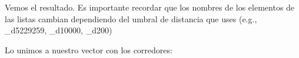 \documentclass[
]{book}
\newenvironment{Shaded}{\begin{snugshade}}{\end{snugshade}}
\newcommand{\CommentTok}[1]{\textcolor[rgb]{0.56,0.35,0.01}{\textit{#1}}}
\newcommand{\FunctionTok}[1]{\textcolor[rgb]{0.13,0.29,0.53}{\textbf{#1}}}
\newcommand{\NormalTok}[1]{#1}
\newcommand{\SpecialCharTok}[1]{\textcolor[rgb]{0.81,0.36,0.00}{\textbf{#1}}}
\begin{document}
Vemos el resultado. Es importante recordar que los nombres de los elementos de las listas cambian dependiendo del umbral de distancia que uses (e.g., \_d5229259, \_d10000, \_d200)

\begin{Shaded}
\end{Shaded}

Lo unimos a nuestro vector con los corredores:
\end{document}
